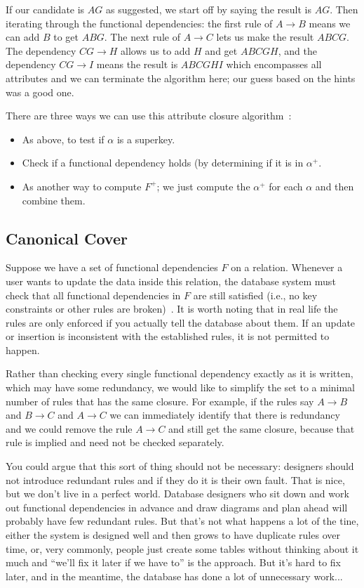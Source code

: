 If our candidate is $AG$ as suggested, we start off by saying the result is $AG$. Then  iterating through the functional dependencies: the first rule of $A \rightarrow B$ means we can add $B$ to get $ABG$. The next rule of $A \rightarrow C$ lets us make the result $ABCG$. The dependency $CG \rightarrow H$ allows us to add $H$ and get $ABCGH$, and the dependency $CG \rightarrow I$ means the result is $ABCGHI$ which encompasses all attributes and we can terminate the algorithm here; our guess based on the hints was a good one.

There are three ways we can use this attribute closure algorithm~\cite{dsc}:
\begin{itemize}
	\item As above, to test if $\alpha$ is a superkey.
	\item Check if a functional dependency holds (by determining if it is in $\alpha^{+}$.
	\item As another way to compute $F^{+}$; we just compute the $\alpha^{+}$ for each $\alpha$ and then combine them. 
\end{itemize}

\subsection*{Canonical Cover}
Suppose we have a set of functional dependencies $F$ on a relation. Whenever a user wants to update the data inside this relation, the database system must check that all functional dependencies in $F$ are still satisfied (i.e., no key constraints or other rules are broken)~\cite{dsc}. It is worth noting that in real life the rules are only enforced if you actually tell the database about them. If an update or insertion is inconsistent with the established rules, it is not permitted to happen.

Rather than checking every single functional dependency exactly as it is written, which may have some redundancy, we would like to simplify the set to a minimal number of rules that has the same closure. For example, if the rules say $A \rightarrow B$ and $B \rightarrow C$ and $A \rightarrow C$ we can immediately identify that there is redundancy and we could remove the rule $A \rightarrow C$ and still get the same closure, because that rule is implied and need not be checked separately.

You could argue that this sort of thing should not be necessary: designers should not introduce redundant rules and if they do it is their own fault. That is nice, but we don't live in a perfect world. Database designers who sit down and work out functional dependencies in advance and draw diagrams and plan ahead will probably have few redundant rules. But that's not what happens a lot of the tine, either the system is designed well and then grows to have duplicate rules over time, or, very commonly, people just create some tables without thinking about it much and ``we'll fix it later if we have to'' is the approach. But it's hard to fix later, and in the meantime, the database has done a lot of unnecessary work...


